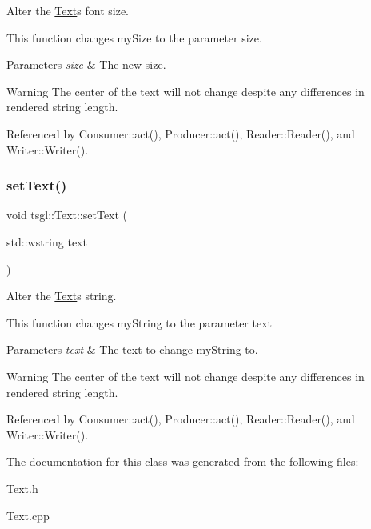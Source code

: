Alter the \hyperlink{classtsgl_1_1_text}{Text}\textquotesingle{}s font size. 

This function changes my\+Size to the parameter size. 
\begin{DoxyParams}{Parameters}
{\em size} & The new size. \\
\hline
\end{DoxyParams}
\begin{DoxyWarning}{Warning}
The center of the text will not change despite any differences in rendered string length. 
\end{DoxyWarning}


Referenced by Consumer\+::act(), Producer\+::act(), Reader\+::\+Reader(), and Writer\+::\+Writer().

\mbox{\label{classtsgl_1_1_text_a16a95a57b45b6a95ad9962cf6aa63027}} 
\subsubsection{\texorpdfstring{set\+Text()}{setText()}}
{\footnotesize\ttfamily void tsgl\+::\+Text\+::set\+Text (\begin{DoxyParamCaption}\item[{std\+::wstring}]{text }\end{DoxyParamCaption})\hspace{0.3cm}{\ttfamily [virtual]}}



Alter the \hyperlink{classtsgl_1_1_text}{Text}\textquotesingle{}s string. 

This function changes my\+String to the parameter text 
\begin{DoxyParams}{Parameters}
{\em text} & The text to change my\+String to. \\
\hline
\end{DoxyParams}
\begin{DoxyWarning}{Warning}
The center of the text will not change despite any differences in rendered string length. 
\end{DoxyWarning}


Referenced by Consumer\+::act(), Producer\+::act(), Reader\+::\+Reader(), and Writer\+::\+Writer().



The documentation for this class was generated from the following files\+:\begin{DoxyCompactItemize}
\item 
Text.\+h\item 
Text.\+cpp\end{DoxyCompactItemize}
